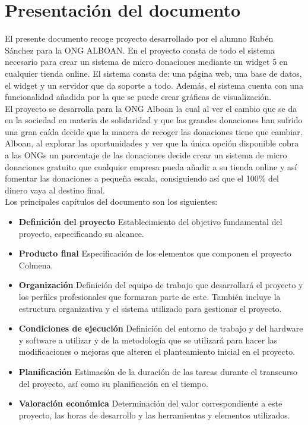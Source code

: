 \section{Presentación del documento}

El presente documento recoge proyecto desarrollado por el alumno Rubén Sánchez para la ONG ALBOAN. En el proyecto consta de todo el sistema necesario para crear un sistema de micro donaciones mediante un widget 5 en cualquier tienda online. El sistema consta de: una página web, una base de datos, el widget y un servidor que da soporte a todo. Además, el sistema cuenta con una funcionalidad añadida por la que se puede crear gráficas de visualización.\\

El proyecto se desarrolla para la ONG Alboan la cual al ver el cambio que se da en la sociedad en materia de solidaridad y que las grandes donaciones han sufrido una gran caída decide que la manera de recoger las donaciones tiene que cambiar. Alboan, al explorar las oportunidades y ver que la única opción disponible cobra a las ONGs un porcentaje de las donaciones decide crear un sistema de micro donaciones gratuito que cualquier empresa pueda añadir a su tienda online y así fomentar las donaciones a pequeña escala, consiguiendo así que el 100\% del dinero vaya al destino final.\\

Los principales capítulos del documento son los siguientes:

\begin{itemize}
	\item \textbf{Definición del proyecto}\smallbreak
	Establecimiento del objetivo fundamental del proyecto, especificando su alcance.
	\item \textbf{Producto final}\smallbreak
	Especificación de los elementos que componen el proyecto Colmena.
	\item \textbf{Organización} \smallbreak
	Definición del equipo de trabajo que desarrollará el proyecto y los perfiles profesionales que formaran parte de este. También incluye la estructura organizativa y el sistema utilizado para gestionar el proyecto.
	\item \textbf{Condiciones de ejecución} \smallbreak
	Definición del entorno de trabajo y del hardware y software a utilizar y de la metodología que se utilizará para hacer las modificaciones o mejoras que alteren el planteamiento inicial en el proyecto.
	\item \textbf{Planificación} \smallbreak
	Estimación de la duración de las tareas durante el transcurso del proyecto, así como su planificación en el tiempo.
	\item \textbf{Valoración económica} \smallbreak
	Determinación del valor correspondiente a este proyecto, las horas de desarrollo y las herramientas y elementos utilizados.
\end{itemize}
